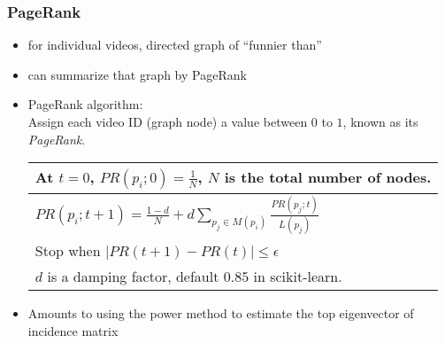 \documentclass[fleqn]{beamer}
\begin{document}
\begin{frame}
\frametitle{PageRank}
      \begin{itemize}
         \item for individual videos, directed graph of ``funnier than''
         \item can summarize that graph by PageRank
         \item PageRank algorithm: \\
               Assign each video ID (graph node) a value
                between $0$ to $1$, known as its \textsl{PageRank}.
         \begin{center}
         \begin{tabular}{| l |}
         \hline
         At $t=0$, $PR(p_{i};0) = \frac{1}{N}$, $N$ is the total number of nodes. \\ \hline
         $PR(p_{i};t+1) = \frac{1-d}{N} + d \sum_{p_{j} \in M(p_{i})} \frac{PR(p_{j};t)}{L(p_{j})}$ \\ \hline
         Stop when $|PR(t+1) - PR(t)| \le \epsilon$ \\ \hline
         $d$ is a damping factor, default $0.85$ in scikit-learn. \\
         \hline
         \end{tabular}
         \end{center}
         \item Amounts to using the power method to estimate the top 
                  eigenvector of incidence matrix
     \end{itemize}

\end{frame}
\end{document}
